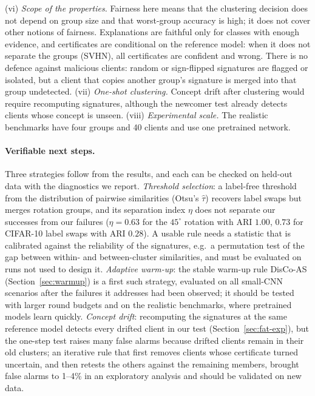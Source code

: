 (vi) \emph{Scope of the properties.} Fairness here means that the clustering decision does not depend on group size and that worst-group accuracy is high; it does not cover other notions of fairness. Explanations are faithful only for classes with enough evidence, and certificates are conditional on the reference model: when it does not separate the groups (SVHN), all certificates are confident and wrong. There is no defence against malicious clients: random or sign-flipped signatures are flagged or isolated, but a client that copies another group's signature is merged into that group undetected.
(vii) \emph{One-shot clustering.} Concept drift after clustering would require recomputing signatures, although the newcomer test already detects clients whose concept is unseen.
(viii) \emph{Experimental scale.} The realistic benchmarks have four groups and 40 clients and use one pretrained network.

\paragraph{Verifiable next steps.} Three strategies follow from the results, and each can be checked on held-out data with the diagnostics we report. \emph{Threshold selection}: a label-free threshold from the distribution of pairwise similarities (Otsu's $\hat\tau$) recovers label swaps but merges rotation groups, and its separation index $\eta$ does not separate our successes from our failures ($\eta=0.63$ for the $45^\circ$ rotation with ARI $1.00$, $0.73$ for CIFAR-10 label swaps with ARI $0.28$). A usable rule needs a statistic that is calibrated against the reliability of the signatures, e.g.\ a permutation test of the gap between within- and between-cluster similarities, and must be evaluated on runs not used to design it. \emph{Adaptive warm-up}: the stable warm-up rule DisCo-AS (Section~\ref{sec:warmup}) is a first such strategy, evaluated on all small-CNN scenarios after the failures it addresses had been observed; it should be tested with larger round budgets and on the realistic benchmarks, where pretrained models learn quickly. \emph{Concept drift}: recomputing the signatures at the same reference model detects every drifted client in our test (Section~\ref{sec:fat-exp}), but the one-step test raises many false alarms because drifted clients remain in their old clusters; an iterative rule that first removes clients whose certificate turned uncertain, and then retests the others against the remaining members, brought false alarms to 1--4\% in an exploratory analysis and should be validated on new data.
